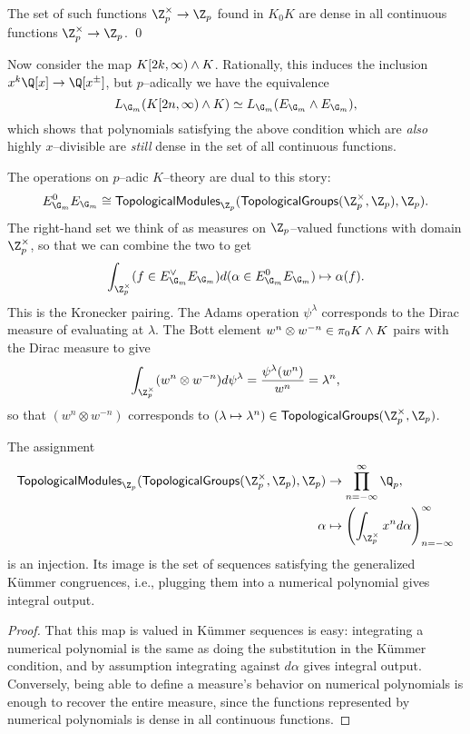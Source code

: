 \begin{corollary}
The set of such functions $\Z_p^\times \to \Z_p$ found in $K_0 K$ are dense in all continuous functions $\Z_p^\times \to \Z_p$. \qed
\end{corollary}

Now consider the map $K[2k, \infty) \wedge K$.  Rationally, this induces the inclusion $x^k\Q[x] \to \Q[x^\pm]$, but $p$--adically we have the equivalence \[L_{\G_m}(K[2n, \infty) \sm K) \simeq L_{\G_m}(E_{\G_m} \sm E_{\G_m}),\] which shows that polynomials satisfying the above condition which are \emph{also} highly $x$--divisible are \emph{still} dense in the set of all continuous functions.

The operations on $p$--adic $K$--theory are dual to this story: \[E_{\G_m}^0 E_{\G_m} \cong \CatOf{TopologicalModules}_{\Z_p}(\CatOf{TopologicalGroups}(\Z_p^{\times}, \Z_p), \Z_p).\]  The right-hand set we think of as measures on $\Z_p$--valued functions with domain $\Z_p^\times$, so that we can combine the two to get \[\int_{\Z_p^\times} (f \in E_{\G_m}^\vee E_{\G_m}) d(\alpha \in E_{\G_m}^0 E_{\G_m}) \mapsto \alpha(f).\]  This is the Kronecker pairing.  The Adams operation $\psi^\lambda$ corresponds to the Dirac measure of evaluating at $\lambda$.  The Bott element $w^n \otimes w^{-n} \in \pi_0 K \wedge K$ pairs with the Dirac measure to give \[\int_{\Z_p^\times} (w^n \otimes w^{-n}) d\psi^\lambda = \frac{\psi^\lambda(w^n)}{w^n} = \lambda^n,\] so that $(w^n \otimes w^{-n})$ corresponds to $(\lambda \mapsto \lambda^n) \in \CatOf{TopologicalGroups}(\Z_p^\times, \Z_p)$.

\begin{theorem}
The assignment
\begin{align*}
\CatOf{TopologicalModules}_{\Z_p}(\CatOf{TopologicalGroups}(\Z_p^\times, \Z_p), \Z_p) & \to \prod_{n=-\infty}^\infty \Q_p, \\
\alpha & \mapsto \left(\int_{\Z_p^\times} x^n d\alpha\right)_{n=-\infty}^\infty
\end{align*}
is an injection.  Its image is the set of sequences satisfying the generalized K\"ummer congruences, i.e., plugging them into a numerical polynomial gives integral output.
\end{theorem}
\begin{proof}
That this map is valued in K\"ummer sequences is easy: integrating a numerical polynomial is the same as doing the substitution in the K\"ummer condition, and by assumption integrating against $d\alpha$ gives integral output.  Conversely, being able to define a measure's behavior on numerical polynomials is enough to recover the entire measure, since the functions represented by numerical polynomials is dense in all continuous functions.
\end{proof}

